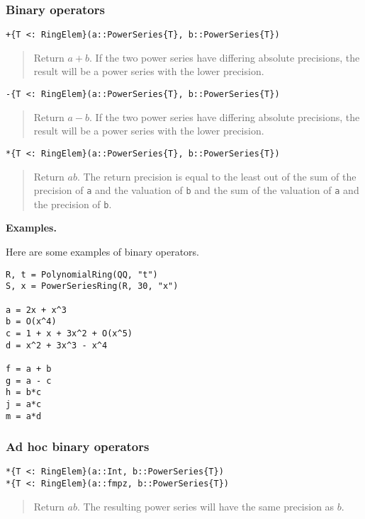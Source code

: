 \documentclass[a4paper,10pt]{article}
\newcommand{\code}{\lstinline}
\newcommand{\desc}[1]{\vspace{-3mm}\begin{quote}#1\end{quote}}
\begin{document}
\subsubsection{Binary operators}

\begin{lstlisting}
+{T <: RingElem}(a::PowerSeries{T}, b::PowerSeries{T})
\end{lstlisting}

\desc{Return $a + b$. If the two power series have differing absolute
precisions, the result will be a power series with the lower precision.}

\begin{lstlisting}
-{T <: RingElem}(a::PowerSeries{T}, b::PowerSeries{T})
\end{lstlisting}

\desc{Return $a - b$. If the two power series have differing absolute
precisions, the result will be a power series with the lower precision.}

\begin{lstlisting}
*{T <: RingElem}(a::PowerSeries{T}, b::PowerSeries{T})
\end{lstlisting}

\desc{Return $ab$. The return precision is equal to the least out of the
sum of the precision of \code{a} and the valuation of \code{b} and
the sum of the valuation of \code{a} and the precision of \code{b}.}

\textbf{Examples.}

Here are some examples of binary operators.

\begin{lstlisting}
R, t = PolynomialRing(QQ, "t")
S, x = PowerSeriesRing(R, 30, "x")

a = 2x + x^3
b = O(x^4)
c = 1 + x + 3x^2 + O(x^5)
d = x^2 + 3x^3 - x^4

f = a + b
g = a - c
h = b*c
j = a*c
m = a*d
\end{lstlisting}

\subsubsection{Ad hoc binary operators}

\begin{lstlisting}
*{T <: RingElem}(a::Int, b::PowerSeries{T})
*{T <: RingElem}(a::fmpz, b::PowerSeries{T})
\end{lstlisting}

\desc{Return $ab$. The resulting power series will have the same precision as
$b$.}
\end{document}
